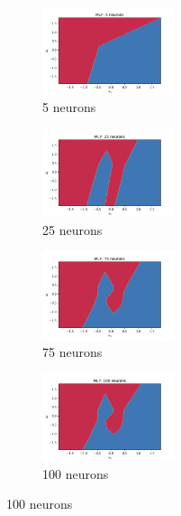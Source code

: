 \documentclass[a4paper]{article}    %
\begin{document}

\begin{figure}[H]
    \centering
    \begin{subfigure}{0.32\textwidth}
        \centering
        \includegraphics[width=3.85cm]{decision_regions_5}
        \caption{5 neurons}
        \label{fig:mlp-5_neurons}
    \end{subfigure}
    \hfill
    \begin{subfigure}{0.32\textwidth}
        \centering
        \includegraphics[width=3.85cm]{decision_regions_25}
        \caption{25 neurons}
        \label{fig:mlp-25_neurons}
    \end{subfigure}
    \hfill
    \begin{subfigure}{0.32\textwidth}
        \centering
        \includegraphics[width=3.85cm]{decision_regions_75}
        \caption{75 neurons}
        \label{fig:mlp-75_neurons}
    \end{subfigure}
    \hfill
    \begin{subfigure}{0.32\textwidth}
        \centering
        \includegraphics[width=3.85cm]{decision_regions_100}
        \caption{100 neurons}
        \label{fig:mlp-100_neurons}
    \end{subfigure}

\end{figure}
\end{document}
